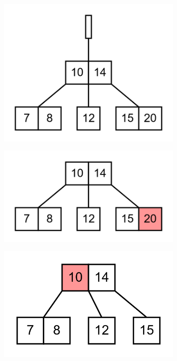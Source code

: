 \documentclass[11pt,a4paper]{article}
\begin{document}
\begin{loesung}
\begin{enumerate}
\begin{figure}[h!]
\begin{subfigure}[b]{0.31\textwidth}
                \includegraphics[scale=0.15]{img/3e/13}
            \end{subfigure}
            \begin{subfigure}[b]{0.31\textwidth}
                \centering
                \includegraphics[scale=0.15]{img/3e/14}
            \end{subfigure}
            \begin{subfigure}[b]{0.31\textwidth}
                \centering
                \includegraphics[scale=0.15]{img/3e/15}

\end{subfigure}
\end{figure}
\end{enumerate}
\end{loesung}
\end{document}
